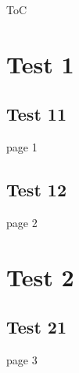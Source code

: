 \documentclass{beamer}
\begin{document}
\begin{frame}{ToC}
\tableofcontents
\end{frame}

\section{Test 1}
\subsection{Test 11}
\begin{frame}
page 1
\end{frame}
\subsection{Test 12}
\begin{frame}
page 2
\end{frame}


\section{Test 2}
\subsection{Test 21}
\begin{frame}
page 3
\end{frame}
\end{document}
